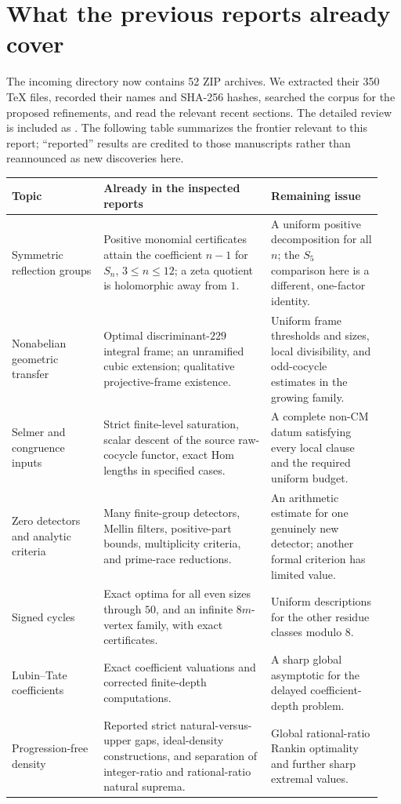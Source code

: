 \section{What the previous reports already cover}

The incoming directory now contains 52 ZIP archives. We extracted their
350 TeX files, recorded their names and SHA-256 hashes, searched the corpus
for the proposed refinements, and read the relevant recent sections.
The detailed review is included as .
The following table summarizes the frontier relevant to this report;
``reported'' results are credited to those manuscripts rather than
reannounced as new discoveries here.

\begin{longtable}{@{}>{\raggedright\arraybackslash}p{0.23\linewidth}>{\raggedright\arraybackslash}p{0.42\linewidth}>{\raggedright\arraybackslash}p{0.29\linewidth}@{}}
\toprule
Topic & Already in the inspected reports & Remaining issue\\
\midrule\endhead
Symmetric reflection groups &
Positive monomial certificates attain the coefficient $n-1$ for
$S_n$, $3\le n\le12$; a zeta quotient is holomorphic away from $1$.
& A uniform positive decomposition for all $n$; the $S_5$ comparison here
is a different, one-factor identity.\\[4pt]
Nonabelian geometric transfer &
Optimal discriminant-$229$ integral frame; an unramified cubic extension;
qualitative projective-frame existence.
& Uniform frame thresholds and sizes, local divisibility, and odd-cocycle
estimates in the growing family.\\[4pt]
Selmer and congruence inputs &
Strict finite-level saturation, scalar descent of the source raw-cocycle
functor, exact Hom lengths in specified cases.
& A complete non-CM datum satisfying every local clause and the required
uniform budget.\\[4pt]
Zero detectors and analytic criteria &
Many finite-group detectors, Mellin filters, positive-part bounds,
multiplicity criteria, and prime-race reductions.
& An arithmetic estimate for one genuinely new detector; another formal
criterion has limited value.\\[4pt]
Signed cycles &
Exact optima for all even sizes through $50$, and an infinite
$8m$-vertex family, with exact certificates.
& Uniform descriptions for the other residue classes modulo $8$.\\[4pt]
Lubin--Tate coefficients &
Exact coefficient valuations and corrected finite-depth computations.
& A sharp global asymptotic for the delayed coefficient-depth problem.\\[4pt]
Progression-free density &
Reported strict natural-versus-upper gaps, ideal-density constructions,
and separation of integer-ratio and rational-ratio natural suprema.
& Global rational-ratio Rankin optimality and further sharp extremal values.\\
\bottomrule
\end{longtable}

